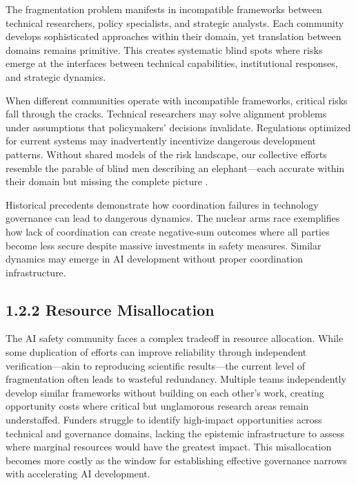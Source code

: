\documentclass[
  11pt,
  letterpaper,
  openany]{book}
\begin{document}
The fragmentation problem manifests in incompatible frameworks between
technical researchers, policy specialists, and strategic analysts. Each
community develops sophisticated approaches within their domain, yet
translation between domains remains primitive. This creates systematic
blind spots where risks emerge at the interfaces between technical
capabilities, institutional responses, and strategic dynamics.

When different communities operate with incompatible frameworks,
critical risks fall through the cracks. Technical researchers may solve
alignment problems under assumptions that policymakers' decisions
invalidate. Regulations optimized for current systems may inadvertently
incentivize dangerous development patterns. Without shared models of the
risk landscape, our collective efforts resemble the parable of blind men
describing an elephant---each accurate within their domain but missing
the complete picture \textcite{paul2023}.

Historical precedents demonstrate how coordination failures in
technology governance can lead to dangerous dynamics. The nuclear arms
race exemplifies how lack of coordination can create negative-sum
outcomes where all parties become less secure despite massive
investments in safety measures. Similar dynamics may emerge in AI
development without proper coordination infrastructure.

\subsection{1.2.2 Resource Misallocation}\label{resource-misallocation}

The AI safety community faces a complex tradeoff in resource allocation.
While some duplication of efforts can improve reliability through
independent verification---akin to reproducing scientific results---the
current level of fragmentation often leads to wasteful redundancy.
Multiple teams independently develop similar frameworks without building
on each other's work, creating opportunity costs where critical but
unglamorous research areas remain understaffed. Funders struggle to
identify high-impact opportunities across technical and governance
domains, lacking the epistemic infrastructure to assess where marginal
resources would have the greatest impact. This misallocation becomes
more costly as the window for establishing effective governance narrows
with accelerating AI development.
\end{document}
